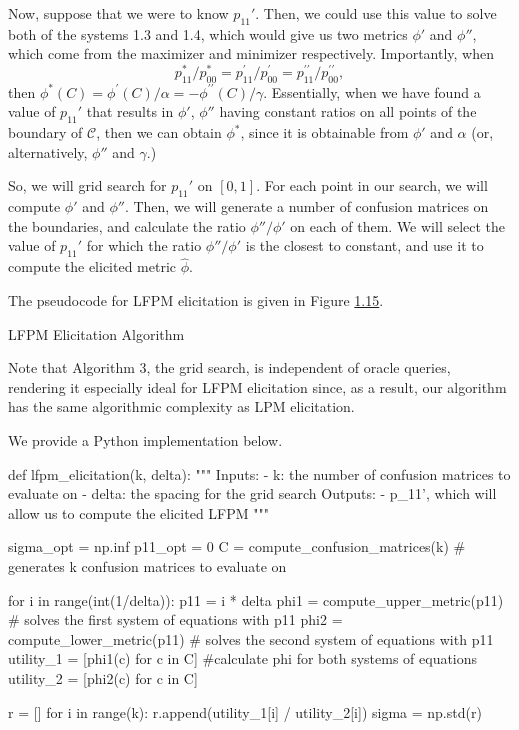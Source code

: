 \documentclass[
  letterpaper,
  DIV=11,
  numbers=noendperiod,
  oneside]{scrreprt}
\theoremstyle{remark}
\begin{document}
Now, suppose that we were to know \(p_{11}'\). Then, we could use this
value to solve both of the systems 1.3 and 1.4, which would give us two
metrics \(\phi'\) and \(\phi''\), which come from the maximizer and
minimizer respectively. Importantly, when
\[p_{11}^{*} / p_{00}^{*}=p_{11}^{\prime} / p_{00}^{\prime}=p_{11}^{\prime \prime} / p_{00}^{\prime \prime},\]
then
\(\phi^{*}(C)=\phi^{\prime}(C) / \alpha=-\phi^{\prime \prime}(C) / \gamma\).
Essentially, when we have found a value of \(p_{11}'\) that results in
\(\phi'\), \(\phi''\) having constant ratios on all points of the
boundary of \(\mathcal{C}\), then we can obtain \(\phi^*\), since it is
obtainable from \(\phi'\) and \(\alpha\) (or, alternatively, \(\phi''\)
and \(\gamma\).)

So, we will grid search for \(p_{11}'\) on \([0,1]\). For each point in
our search, we will compute \(\phi'\) and \(\phi''\). Then, we will
generate a number of confusion matrices on the boundaries, and calculate
the ratio \(\phi'' / \phi'\) on each of them. We will select the value
of \(p_{11}'\) for which the ratio \(\phi'' / \phi'\) is the closest to
constant, and use it to compute the elicited metric \(\hat{\phi}\).

The pseudocode for LFPM elicitation is given in Figure
\hyperref[lfpm]{1.15}.

LFPM Elicitation Algorithm

Note that Algorithm 3, the grid search, is independent of oracle
queries, rendering it especially ideal for LFPM elicitation since, as a
result, our algorithm has the same algorithmic complexity as LPM
elicitation.

We provide a Python implementation below.

def lfpm\_elicitation(k, delta): """ Inputs: - k: the number of
confusion matrices to evaluate on - delta: the spacing for the grid
search Outputs: - p\_11', which will allow us to compute the elicited
LFPM """

sigma\_opt = np.inf p11\_opt = 0 C = compute\_confusion\_matrices(k) \#
generates k confusion matrices to evaluate on

for i in range(int(1/delta)): p11 = i * delta phi1 =
compute\_upper\_metric(p11) \# solves the first system of equations with
p11 phi2 = compute\_lower\_metric(p11) \# solves the second system of
equations with p11 utility\_1 = {[}phi1(c) for c in C{]} \#calculate phi
for both systems of equations utility\_2 = {[}phi2(c) for c in C{]}

r = {[}{]} for i in range(k): r.append(utility\_1{[}i{]} /
utility\_2{[}i{]}) sigma = np.std(r)
\end{document}
